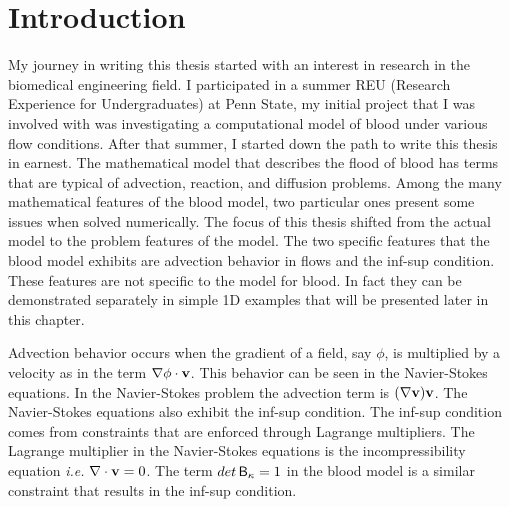 %
\chapter{Introduction} \label{chapter1:introduction}
%
My journey in writing this thesis started with an interest in research in the biomedical engineering field. I participated in a summer REU (Research Experience for Undergraduates) at Penn State, my initial project that I was involved with was investigating  a computational model of blood under various flow conditions. After that summer, I started down the path to write this thesis in earnest. The mathematical model that describes the flood of blood has terms that are typical of advection, reaction, and diffusion problems. Among the many mathematical features of the blood model, two particular ones present some issues when solved numerically. The focus of this thesis shifted from the actual model to the problem features of the model. The two specific features that the blood model exhibits are advection behavior in flows and the inf-sup condition. These features are not specific to the model for blood. In fact they can be demonstrated separately in simple 1D examples that will be presented later in this chapter.


Advection behavior occurs when the gradient of a field, say $\phi$, is multiplied by a velocity as in the term $\nabla\phi\cdot\boldsymbol{\mathbf{v}}$. This behavior can be seen in the Navier-Stokes equations. In the Navier-Stokes problem the advection term is $(\nabla\boldsymbol{\mathbf{v}})\boldsymbol{\mathbf{v}}$. The Navier-Stokes equations also exhibit the inf-sup condition. The inf-sup condition comes from constraints that are enforced through Lagrange multipliers. The Lagrange multiplier in the Navier-Stokes equations is the incompressibility equation \textit{i.e.} $\nabla\cdot\boldsymbol{\mathbf{v}} = 0$. The term $det\,\mathsf{B_{\kappa}}=1$ in the blood model is a similar constraint that results in the inf-sup condition.
%
